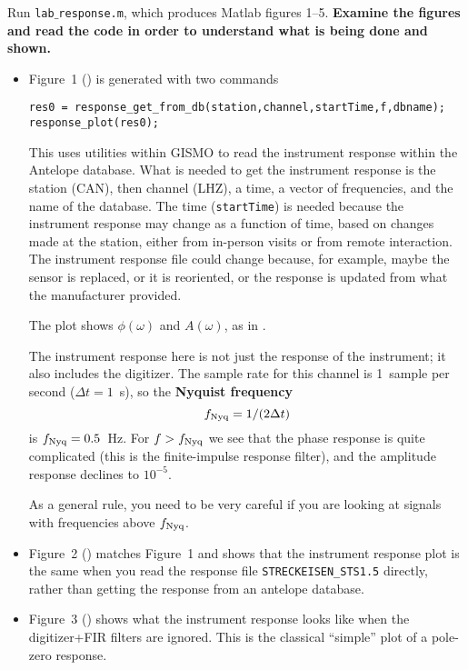\documentclass[11pt,titlepage,fleqn]{article}
\newcommand{\tfile}{{\tt lab$\_$response.m}}
\begin{document}
Run \tfile, which produces Matlab figures 1--5. {\bf Examine the figures and read the code in order to understand what is being done and shown.}
%
\begin{itemize}
\item Figure~1 () is generated with two commands
%
\begin{verbatim}
res0 = response_get_from_db(station,channel,startTime,f,dbname);
response_plot(res0);
\end{verbatim}
%
This uses utilities within GISMO to read the instrument response within the Antelope database. What is needed to get the instrument response is the station (CAN), then channel (LHZ), a time, a vector of frequencies, and the name of the database. The time (\verb+startTime+) is needed because the instrument response may change as a function of time, based on changes made at the station, either from in-person visits or from remote interaction. The instrument response file could change because, for example, maybe the sensor is replaced, or it is reoriented, or the response is updated from what the manufacturer provided.

The plot shows $\phi(\omega)$ and $A(\omega)$, as in .

The instrument response here is not just the response of the instrument; it also includes the digitizer. The sample rate for this channel is 1~sample per second ($\Delta t = 1$~s), so the {\bf Nyquist frequency}
%
\begin{equation}
f_{\rm Nyq} = 1/(2\Delta t)
\end{equation}
%
is $f_{\rm Nyq} = 0.5$~Hz. For $f > f_{\rm Nyq}$ we see that the phase response is quite complicated (this is the finite-impulse response filter), and the amplitude response declines to $10^{-5}$.

As a general rule, you need to be very careful if you are looking at signals with frequencies above $f_{\rm Nyq}$.

\item Figure~2 () matches Figure~1 and shows that the instrument response plot is the same when you read the response file \verb+STRECKEISEN_STS1.5+ directly, rather than getting the response from an antelope database.

\item Figure~3 () shows what the instrument response looks like when the digitizer+FIR filters are ignored. This is the classical ``simple'' plot of a pole-zero response.


\end{itemize}
\end{document}

